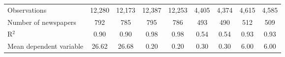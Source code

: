{\begin{tabular}{l*{8}{c}}
\midrule
Observations        &      12,280         &      12,173         &      12,387         &      12,253         &       4,405         &       4,374         &       4,615         &       4,585         \\
Number of newspapers&         792         &         785         &         795         &         786         &         493         &         490         &         512         &         509         \\
R$^2$               &        0.90         &        0.90         &        0.98         &        0.98         &        0.54         &        0.54         &        0.93         &        0.93         \\
Mean dependent variable&       26.62         &       26.68         &        0.20         &        0.20         &        0.30         &        0.30         &        6.00         &        6.00         \\
\bottomrule
\end{tabular}
}
